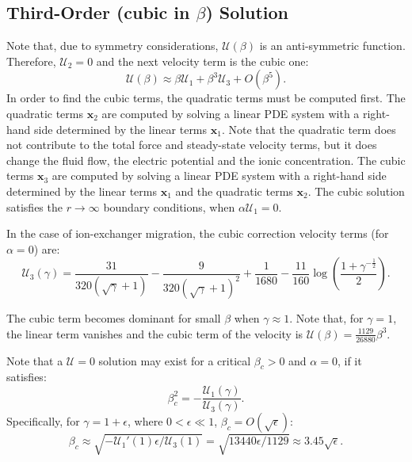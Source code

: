 \documentclass[10pt]{ijnam}
\newcommand\eps \epsilon
\newcommand{\pars}[1]{\left(#1\right)}
\newcommand\bx{\boldsymbol{x}}
\newcommand\cU{\mathscr{U}}
\begin{document}
\subsection{Third-Order (cubic in $\beta$) Solution} \label{app:cubic}
Note that, due to symmetry considerations, $\cU(\beta)$ is an anti-symmetric function.
Therefore, $\cU_2 = 0$ and the next velocity term is the cubic one:
\begin{equation} \label{eq:cubic}
\cU(\beta) \approx \beta \cU_1 + \beta^3 \cU_3 + O(\beta^5).
\end{equation}
In order to find the cubic terms, the quadratic terms must be computed first.
The quadratic terms $\bx_2$ are computed by solving a linear PDE system 
with a right-hand side determined by the linear terms $\bx_1$.
Note that the quadratic term does not contribute to the total force and steady-state 
velocity terms, but it does change the fluid flow, 
the electric potential and the ionic concentration.
The cubic terms $\bx_3$ are computed by solving a linear PDE system 
with a right-hand side determined by the linear terms $\bx_1$ and the quadratic terms $\bx_2$.
The cubic solution satisfies the ${r\rightarrow\infty}$ boundary conditions, 
when $\alpha\cU_1 = 0$.

In the case of ion-exchanger migration,
the cubic correction \cite{zeyde2012report} velocity terms (for $\alpha = 0$)
 are:
\begin{equation}
\cU_3(\gamma) = \frac{31}{320(\sqrt\gamma + 1)} - \frac{9}{320(\sqrt\gamma + 1)^2} + \frac{1}{1680} - \frac{11}{160} \log \pars{\frac{1 + \gamma^{-\frac{1}{2}}}{2}}.
\end{equation}

The cubic term becomes dominant for small $\beta$ when $\gamma \approx 1$.
Note that, for $\gamma = 1$, the linear term vanishes and the cubic term 
of the velocity is $\cU(\beta) = \frac{1129}{26880}\beta^3$.

Note that a $\cU = 0$ solution may exist for a critical $\beta_c > 0$ and $\alpha = 0$, 
if it satisfies:
\begin{equation} \label{eq:crit_beta}
\beta_c^2 = -\frac{\cU_1(\gamma)}{\cU_3(\gamma)}.
\end{equation}
Specifically, for $\gamma = 1 + \eps$, where $0 < \eps \ll 1$, $\beta_c = O\pars{\sqrt{\eps}}$:
\begin{equation}
\beta_c \approx \sqrt{-{\cU_1'(1) \eps}/{\cU_3(1)}} = 
 \sqrt{{13440 \eps}/{1129}} \approx 3.45 \sqrt{\eps}.
\end{equation}
\end{document}
